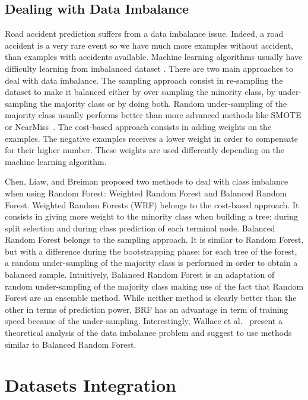 \documentclass[conference]{IEEEtran}
\begin{document}
\subsection{Dealing with Data Imbalance}

Road accident prediction suffers from a data imbalance issue. Indeed, a road
accident is a very rare event so we have much more examples without accident, than examples with accidents available. Machine learning algorithms usually
have difficulty learning from imbalanced dataset \cite{Branco2016}.
There are two main approaches to deal with data imbalance. The sampling approach
consist in re-sampling the dataset to make it balanced either by over sampling the
minority class, by under-sampling the majority class or by doing both.
Random under-sampling of the majority class usually performs better than
more advanced methods like SMOTE or NearMiss~\cite{Branco2016}.
The cost-based approach consists in adding weights on the examples. The
negative examples receives a lower weight in order to compensate for their
higher number. These weights are used differently depending on the machine
learning algorithm. 

Chen, Liaw, and Breiman\cite{Chen2004} proposed two methods to deal with class imbalance
when using Random Forest: Weighted Random Forest and Balanced Random Forest.
Weighted Random
Forests (WRF) belongs to the cost-based approach. It consists in giving more weight to the minority class when building a tree: during split selection and during 
class prediction of each terminal node. Balanced Random Forest belongs to the sampling
approach. It is similar to Random Forest, but with a
difference during the bootstrapping phase: for each tree of the forest, a random under-sampling of the
majority class is performed in order to obtain a balanced sample. Intuitively,
Balanced Random Forest is an adaptation of random under-sampling of the majority
class making use of the fact that Random Forest are an ensemble method.
While neither method is clearly better than the other in terms of prediction
power, BRF has an advantage in term of training speed because of the under-sampling. Interestingly, Wallace et al.~\cite{Wallace2011} present a theoretical analysis of the data
imbalance problem and suggest to use methods similar to Balanced Random Forest.


\section{Datasets Integration}
\end{document}

